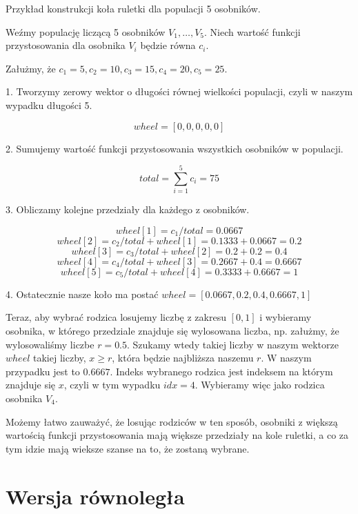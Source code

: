 \begin{example}
    Przykład konstrukcji koła ruletki dla populacji 5 osobników. 

    Weźmy populację liczącą 5 osobników $V_1, \dots, V_5$. Niech wartość funkcji przystosowania dla osobnika $V_i$ będzie równa $c_i$.

    Załużmy, że $c_1 = 5, c_2 = 10, c_3 = 15, c_4 = 20, c_5 = 25$.

    1. Tworzymy zerowy wektor o długości równej wielkości populacji, czyli w naszym wypadku długości 5.

    $$wheel = [0, 0, 0, 0, 0]$$

    2. Sumujemy wartość funkcji przystosowania wszystkich osobników w populacji.

    $$total = \sum_{i=1}^{5} c_i = 75$$

    3. Obliczamy kolejne przedziały dla każdego z osobników.

    $$wheel[1] = c_1 / total = 0.0667$$
    $$wheel[2] = c_2 / total + wheel[1] = 0.1333 + 0.0667 = 0.2$$
    $$wheel[3] = c_3 / total + wheel[2] = 0.2 + 0.2 = 0.4$$
    $$wheel[4] = c_4 / total + wheel[3] = 0.2667 + 0.4 = 0.6667$$
    $$wheel[5] = c_5 / total + wheel[4] = 0.3333 + 0.6667 = 1$$

    4. Ostatecznie nasze koło ma postać $wheel = [0.0667, 0.2, 0.4, 0.6667, 1]$

    Teraz, aby wybrać rodzica losujemy liczbę z zakresu $[0, 1]$ i wybieramy osobnika, w którego przedziale znajduje się wylosowana liczba, np.
    załużmy, że wylosowaliśmy liczbe $r = 0.5$. Szukamy wtedy takiej liczby w naszym wektorze $wheel$ takiej liczby, $x \ge r$, która będzie najbliższa 
    naszemu $r$. W naszym przypadku jest to $0.6667$. Indeks wybranego rodzica jest indeksem na którym znajduje się $x$, czyli w tym wypadku $idx = 4$.
    Wybieramy więc jako rodzica osobnika $V_4$.

    Możemy łatwo zauważyć, że losując rodziców w ten sposób, osobniki z większą wartością funkcji przystosowania mają większe przedziały na kole 
    ruletki, a co za tym idzie mają wieksze szanse na to, że zostaną wybrane.
    
\end{example}

\section{Wersja równoległa}

